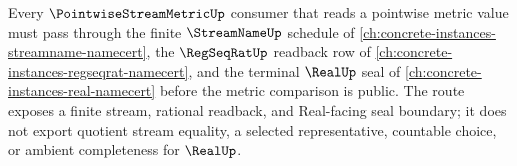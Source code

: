 Every $\PointwiseStreamMetricUp$ consumer that reads a pointwise metric value must pass through the finite $\StreamNameUp$ schedule of \autoref{ch:concrete-instances-streamname-namecert}, the $\RegSeqRatUp$ readback row of \autoref{ch:concrete-instances-regseqrat-namecert}, and the terminal $\RealUp$ seal of \autoref{ch:concrete-instances-real-namecert} before the metric comparison is public. The route exposes a finite stream, rational readback, and Real-facing seal boundary; it does not export quotient stream equality, a selected representative, countable choice, or ambient completeness for $\RealUp$.
